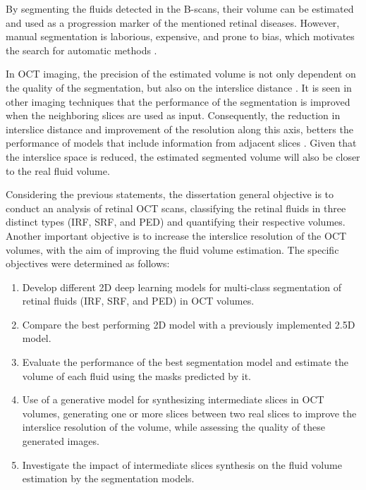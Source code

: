\par
By segmenting the fluids detected in the B-scans, their volume can be estimated and used as a progression marker of the mentioned retinal diseases. However, manual segmentation is laborious, expensive, and prone to bias, which motivates the search for automatic methods \cite{Viedma2022}. 
\par
In OCT imaging, the precision of the estimated volume is not only dependent on the quality of the segmentation, but also on the interslice distance \cite{Lopez2023}. It is seen in other imaging techniques that the performance of the segmentation is improved when the neighboring slices are used as input. Consequently, the reduction in interslice distance and improvement of the resolution along this axis, betters the performance of models that include information from adjacent slices \cite{Selvi2013}. Given that the interslice space is reduced, the estimated segmented volume will also be closer to the real fluid volume.
\par
Considering the previous statements, the dissertation general objective is to conduct an analysis of retinal OCT scans, classifying the retinal fluids in three distinct types (IRF, SRF, and PED) and quantifying their respective volumes. Another important objective is to increase the interslice resolution of the OCT volumes, with the aim of improving the fluid volume estimation. The specific objectives were determined as follows:  
\begin{enumerate}
	\item Develop different 2D deep learning models for multi-class segmentation of retinal fluids (IRF, SRF, and PED) in OCT volumes.
	\item Compare the best performing 2D model with a previously implemented 2.5D model.
	\item Evaluate the performance of the best segmentation model and estimate the volume of each fluid using the masks predicted by it.
	\item Use of a generative model for synthesizing intermediate slices in OCT volumes, generating one or more slices between two real slices to improve the interslice resolution of the volume, while assessing the quality of these generated images.
	\item Investigate the impact of intermediate slices synthesis on the fluid volume estimation by the segmentation models. 
\end{enumerate}
\par
